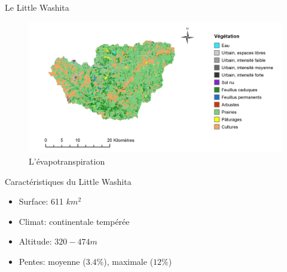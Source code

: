 \documentclass{beamer}
\numberwithin{equation}{section}
\begin{document}
	\begin{frame}{Le Little Washita}
		\begin{minipage}[b]{0.6\linewidth}
			\begin{figure}
				\begin{center}
					\includegraphics[scale=0.12]{little_washita_vegetation.png}
				\end{center}
				\caption{L'évapotranspiration}
			\end{figure} 
		\end{minipage}\hfill
		\begin{minipage}[b]{0.4\linewidth}
			\begin{block}{Caractéristiques du Little Washita}
				\begin{itemize}
					\item Surface: 611 $km^2$
					\item Climat: continentale tempérée
					\item Altitude: $320-474m$
					\item Pentes: moyenne ($3.4\%$), maximale ($12\%$)
				\end{itemize}
			\end{block}
		\end{minipage}
	\end{frame}
\end{document}
